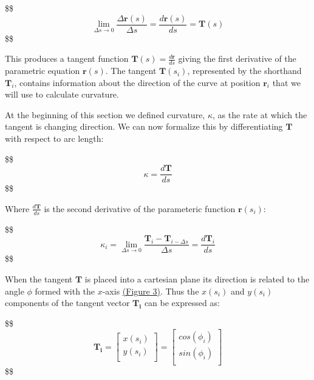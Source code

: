 \documentclass[]{article}
\begin{document}
\$\$ \begin{equation}
\tag{2}

\lim\limits_{\Delta s \to 0} \frac{\Delta \mathbf{r}(s)}{\Delta s} = \frac{d \mathbf{r}(s)}{ds} = \mathbf{T}(s)  

\end{equation} \$\$

This produces a tangent function
\(\mathbf{T}(s) = \frac{d \mathbf{r}}{ds}\) giving the first derivative
of the parametric equation \(\mathbf{r}(s)\). The tangent
\(\mathbf{T}(s_i)\), represented by the shorthand \(\mathbf{T}_i\),
contains information about the direction of the curve at position
\(\mathbf{r}_i\) that we will use to calculate curvature.

At the beginning of this section we defined curvature, \(\kappa\), as
the rate at which the tangent is changing direction. We can now
formalize this by differentiating \(\mathbf{T}\) with respect to arc
length:

\$\$ \begin{equation}
\tag{3}

\kappa = \frac{d \mathbf{T}}{ds}

\end{equation} \$\$

Where \(\frac{d \mathbf{T}}{ds}\) is the second derivative of the
parameteric function \(\mathbf{r}(s_i)\):

\$\$ \begin{equation}
\tag{4}

\kappa_i = \lim\limits_{\Delta s \to 0} \frac{\mathbf{T}_i - \mathbf{T}_{i- \Delta s}}{\Delta s} = \frac{d \mathbf{T}_i}{ds}

\end{equation} \$\$

When the tangent \(\mathbf{T}\) is placed into a cartesian plane its
direction is related to the angle \(\phi\) formed with the \(x\)-axis
\href{Figures/Figure_3.jpg}{(Figure 3)}. Thus the \(x(s_i)\) and
\(y(s_i)\) components of the tangent vector \(\mathbf{T_i}\) can be
expressed as:

\$\$ \begin{equation}
\tag{5}

\mathbf{T_i} = 

\left[\begin{array}
{rrr}
x(s_i) \\
y(s_i) \\
\end{array}\right] =

\left[\begin{array}
{rrr}
cos(\phi_i) \\
sin(\phi_i) \\
\end{array}\right]

\end{equation} \$\$
\end{document}
